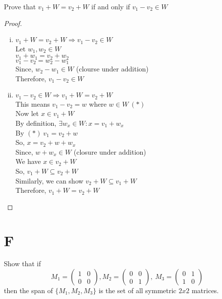\documentclass[11pt]{scrartcl}
\begin{document}
\begin{enumerate}[label=\alph*.]
{{		 Prove that $v_1 + W = v_2 + W$ if and only if $v_1 - v_2 \in W$
		 \begin{proof}
			 \-\
			\begin{enumerate}[i.]
			\item{
				$v_1 + W = v_2 + W \Rightarrow v_1 - v_2 \in W$\\
				Let $w_1, w_2 \in W$\\
				$v_1 + w_1 = v_2 + w_2$\\
				$v_1 - v_2 = w_2 - w_1$\\
				Since, $w_2 - w_1 \in W$ (clourse under addition)\\
				Therefore, $v_1 - v_2 \in W$
				}
			\item{
				$v_1 - v_2 \in W \Rightarrow v_1 + W = v_2 + W $\\
				This means $v_1 - v_2 = w$ where $w \in W \ (*)$\\
				Now let $x \in v_1 + W$\\
				By definition, $\exists w_x \in W : x = v_1 + w_x$\\
				By $(*) \ v_1 = v_2 + w$\\
				So, $x = v_2 + w + w_x$\\
				Since, $w + w_x \in W$ (closure under addition)\\
				We have $x \in v_2 + W$\\
				So, $v_1 + W \subseteq v_2 + W$\\
				Similarly, we can show $v_2 + W \subseteq v_1 + W$\\
				Therefore, $v_1 + W = v_2 + W$

				}
			\end{enumerate}
		 \end{proof}
		}
	}	
\end{enumerate}

\section{F}
Show that if 
\[
M_1 = 
\begin{pmatrix}
1 & 0 \\
0 & 0 
\end{pmatrix},
M_2 = 
\begin{pmatrix}
0 & 0 \\
0 & 1 
\end{pmatrix},
\
M_3 = 
\begin{pmatrix}
0 & 1 \\
1 & 0 
\end{pmatrix}
\]
then the span of $\{M_1, M_2, M_3\}$ is the set of all symmetric $2x2$ matrices.
\end{document}
